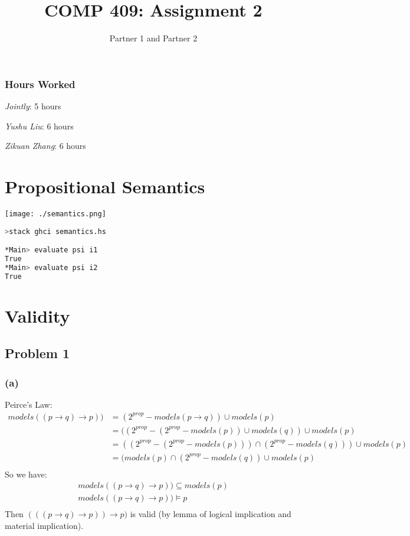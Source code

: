 \documentclass[12pt]{article}
\title{COMP 409: Assignment 2}
\author{Partner 1 and Partner 2}
\begin{document}
\maketitle


\subsubsection*{Hours Worked} 

\noindent\emph{Jointly}: 5 hours

\noindent\emph{Yushu Liu}: 6 hours

\noindent\emph{Zikuan Zhang}: 6 hours

\newpage
\section*{Propositional Semantics}
\begin{center}
	\texttt{[image: ./semantics.png]}
\end{center}
\begin{lstlisting}[language=bash]
>stack ghci semantics.hs

*Main> evaluate psi i1
True
*Main> evaluate psi i2
True
\end{lstlisting}

\newpage
\section*{Validity}
\subsection*{Problem 1}
\subsubsection*{(a)}
Peirce's Law: 
\begin{align*}
    models((p \rightarrow q) \rightarrow p)) 
    & = (2^{prop} - models(p \rightarrow q) )\cup models(p)\\
    & = ((2^{prop} - (2^{prop} - models(p))\cup models(q))\cup models(p)\\
    & = ((2^{prop} - (2^{prop} - models(p)))\cap (2^{prop}-models(q)))\cup models(p)\\
    & =(models(p) \cap (2^{prop} - models(q)) \cup models(p)\\
\end{align*}
So we have: 
\begin{align*}
     models((p \rightarrow q) \rightarrow p)) \subseteq models(p)\\
     models((p \rightarrow q) \rightarrow p)) \models p\\
\end{align*}
Then $(((p \rightarrow q) \rightarrow p))\rightarrow p)$ is valid (by lemma  of logical implication and material implication).
\end{document}
